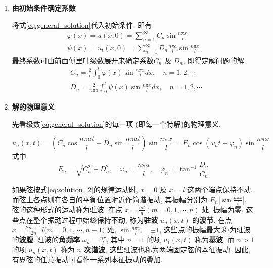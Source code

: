 \begin{solution}
\begin{enumerate}
    \item \textbf{由初始条件确定系数} 
    
        将式\eqref{eq:general_solution}代入初始条件, 即有
        $$
        \begin{gathered}
        \varphi(x)=u(x, 0)=\sum_{n=1}^{\infty} C_{n} \sin \frac{n \pi x}{l} \\
        \psi(x)=u_{t}(x, 0)=\sum_{n=1}^{\infty} D_{n} \frac{n \pi a}{l} \sin \frac{n \pi x}{l}
        \end{gathered}
        $$
        最终系数可由前面傅里叶级数展开来确定系数$C_{n}$ 及 $D_{n}$, 即得定解问题的解.
        $$
        \begin{aligned}
        & C_{n}=\frac{2}{l} \int_{0}^{l} \varphi(x) \sin \frac{n \pi x}{l} d x, \quad n=1,2, \cdots \\
        & D_{n}=\frac{2}{n \pi a} \int_{0}^{l} \psi(x) \sin \frac{n \pi x}{l} d x, \quad n=1,2, \cdots
        \end{aligned}
        $$


        \item \textbf{解的物理意义}
        
        先看级数\eqref{eq:general_solution}的每一项 (即每一个特解)的物理意义.

        \begin{equation}
            u_{n}(x, t)=\left(C_{n} \cos \frac{n \pi a t}{l}+D_{n} \sin \frac{n \pi a t}{l}\right) \sin \frac{n \pi x}{l}
            =E_{n} \cos \left(\omega_{n} t-\varphi_{n}\right) \sin \frac{n \pi x}{l}
            \label{eq:solution_2}
        \end{equation}    
        式中
        $$
        E_{n}=\sqrt{C_{n}^{2}+D_{n}^{2}}, 
            \quad \omega_{n}=\frac{n \pi a}{l}, 
            \quad \varphi_{n}=\tan ^{-1} \frac{D_{n}}{C_{n}}
        $$
        
        如果弦按式\eqref{eq:solution_2}的规律运动时, 
        $x=0$ 及 $x=l$ 这两个端点保持不动. 
        而弦上各点则在各自的平衡位置附近作简谐振动, 
        其振幅分别为 $E_{n}\left|\sin \frac{n \pi x}{l}\right|$. 
        弦的这种形式的运动称为驻波. 
        在点 $x=\frac{m l}{n}(m=0,1, \cdots, n)$ 处, 振幅为零. 
        这些点在整个振动过程中始终保持不动, 称为\textbf{驻波} $u_{n}(x, t)$ 的\textbf{波节}. 
        在点 $x=\frac{2 m+1}{2 n} l(m=0,1$, $\cdots, n-1)$ 处, 
        $\sin \frac{n \pi x}{l}= \pm 1$, 这些点的振幅最大,称为驻波的\textbf{波腹}.
         驻波的\textbf{角频率} $\omega_{n}=\frac{n \pi}{l}$, 
         其中 $n=1$ 的项 $u_{1}(x, t)$ 称为\textbf{基波}, 
         而 $n>1$ 的项 $u_{n}(x, t)$ 称为 \textbf{$n$ 次谐波}, 
         这些驻波也称为两端固定弦的本征振动. 
         因此, 有界弦的任意振动可看作一系列本征振动的叠加.
        

\end{enumerate}
\end{solution}
